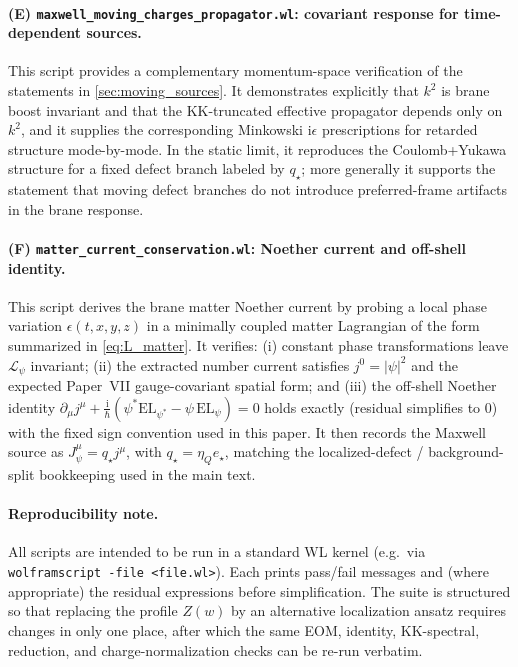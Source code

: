 \documentclass[11pt]{article}
\newcommand{\ii}{\mathrm i}
\newcommand{\Z}{Z}
\newcommand{\etaQ}{\eta_Q}
\newcommand{\estar}{e_\star}
\newcommand{\qstar}{q_\star}
\newcommand{\Jpsi}{J_\psi}
\begin{document}
\paragraph{(E) \texttt{maxwell\_moving\_charges\_propagator.wl}: covariant response for time-dependent sources.}
This script provides a complementary momentum-space verification of the statements
in \cref{sec:moving_sources}. It demonstrates explicitly that \(k^2\) is brane
boost invariant and that the KK-truncated effective propagator depends only on
\(k^2\), and it supplies the corresponding Minkowski \(\ii\epsilon\) prescriptions
for retarded structure mode-by-mode. In the static limit, it reproduces the
Coulomb+Yukawa structure for a fixed defect branch labeled by \(\qstar\); more
generally it supports the statement that moving defect branches do not introduce
preferred-frame artifacts in the brane response.

\paragraph{(F) \texttt{matter\_current\_conservation.wl}: Noether current and off-shell identity.}
This script derives the brane matter Noether current by probing a local phase
variation \(\epsilon(t,x,y,z)\) in a minimally coupled matter Lagrangian of the
form summarized in \cref{eq:L_matter}. It verifies:
(i) constant phase transformations leave \(\mathcal L_\psi\) invariant;
(ii) the extracted number current satisfies \(j^0=|\psi|^2\) and the expected
Paper~VII gauge-covariant spatial form; and (iii) the off-shell Noether identity
\(\partial_\mu j^\mu + \frac{\ii}{\hbar}(\psi^*\mathrm{EL}_{\psi^*}-\psi\,\mathrm{EL}_\psi)=0\)
holds exactly (residual simplifies to \(0\)) with the fixed sign convention used
in this paper. It then records the Maxwell source as \(\Jpsi^\mu=\qstar j^\mu\),
with \(\qstar=\etaQ\estar\), matching the localized-defect / background-split
bookkeeping used in the main text.

\paragraph{Reproducibility note.}
All scripts are intended to be run in a standard WL kernel (e.g.\ via
\texttt{wolframscript -file <file.wl>}). Each prints pass/fail messages and
(where appropriate) the residual expressions before simplification. The suite is
structured so that replacing the profile \(\Z(w)\) by an alternative localization
ansatz requires changes in only one place, after which the same EOM, identity,
KK-spectral, reduction, and charge-normalization checks can be re-run verbatim.
\end{document}
